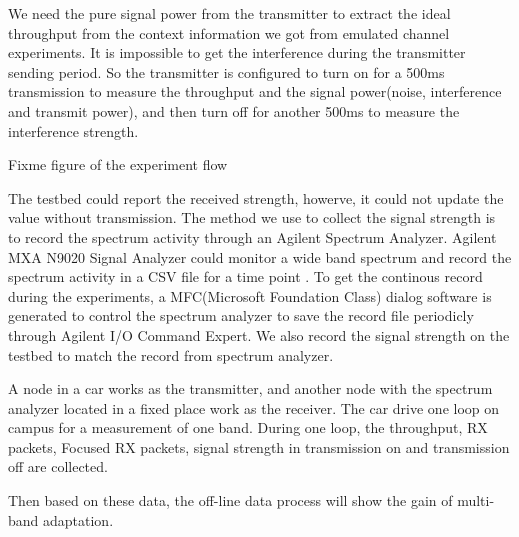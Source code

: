 We need the pure signal power from the transmitter to extract the ideal throughput from the context information we got from emulated channel experiments. It is impossible to get the interference during the transmitter sending period. So the transmitter is configured to turn on for a 500ms transmission to measure the throughput and the signal power(noise, interference and transmit power), and then turn off for another 500ms to measure the interference strength. 

Fixme figure of the experiment flow

The testbed could report the received strength, howerve, it could not update the value without transmission. The method we use to collect the signal strength is to record the spectrum activity through an Agilent Spectrum Analyzer. Agilent MXA N9020 Signal Analyzer could monitor a wide band spectrum and record the spectrum activity in a CSV file for a time point \cite{SA}. To get the continous record during the experiments, a MFC(Microsoft Foundation Class) dialog software is generated to control the spectrum analyzer to save the record file periodicly through Agilent I/O Command Expert\cite{MFC,AC}. We also record the signal strength on the testbed to match the record from spectrum analyzer.

A node in a car works as the transmitter, and another node with the spectrum analyzer located in a fixed place work as the receiver. The car drive one loop on campus for a measurement of one band. During one loop, the throughput, RX packets, Focused RX packets, signal strength in transmission on and transmission off are collected. 


Then based on these data, the off-line data process will show the gain of multi-band adaptation.  
%

